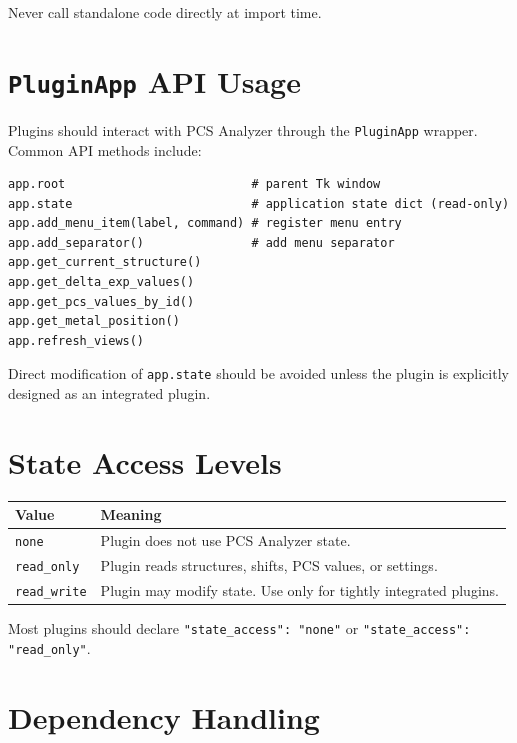 \documentclass[11pt, a4paper]{article}
\begin{document}
Never call standalone code directly at import time.

\section{\texttt{PluginApp} API Usage}

Plugins should interact with PCS Analyzer through the \texttt{PluginApp} wrapper. Common API methods include:

\begin{lstlisting}[style=python]
app.root                          # parent Tk window
app.state                         # application state dict (read-only)
app.add_menu_item(label, command) # register menu entry
app.add_separator()               # add menu separator
app.get_current_structure()
app.get_delta_exp_values()
app.get_pcs_values_by_id()
app.get_metal_position()
app.refresh_views()
\end{lstlisting}

Direct modification of \texttt{app.state} should be avoided unless the plugin is explicitly designed as an integrated plugin.

\section{State Access Levels}

\begin{tabularx}{\linewidth}{@{}M{2.8cm}L@{}}
  \toprule
  \textbf{Value} & \textbf{Meaning} \\
  \midrule
  \texttt{none} & Plugin does not use PCS Analyzer state. \\
  \texttt{read\_only} & Plugin reads structures, shifts, PCS values, or settings. \\
  \texttt{read\_write} & Plugin may modify state. Use only for tightly integrated plugins. \\
  \bottomrule
\end{tabularx}

\vspace{4pt}
Most plugins should declare \texttt{"state\_access": "none"} or \texttt{"state\_access": "read\_only"}.

\section{Dependency Handling}
\end{document}
